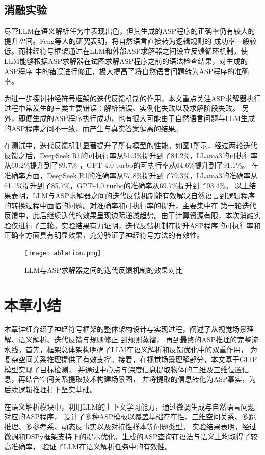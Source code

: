\subsection{消融实验}
尽管LLM在语义解析任务中表现出色，但其生成的ASP程序的正确率仍有较大的提升空间。Feng\cite{feng2024language}等人的研究表明，将自然语言直接转为逻辑规则的
成功率一般较低。而神经符号框架通过在LLM和外部ASP求解器之间设立反馈循环机制，使LLM能够根据ASP求解器在试图求解ASP程序之前的语法检查结果，对生成的ASP程序
中的错误进行修正，极大提高了将自然语言问题转为ASP程序的准确率。

为进一步探讨神经符号框架的迭代反馈机制的作用，本文重点关注ASP求解器执行过程中常发生的三类主要错误：解析错误、实例化失败以及求解阶段失败。
另外，即便生成的ASP程序执行成功，也有很大可能由于自然语言问题与LLM生成的ASP程序之间不一致，而产生与真实答案偏离的结果。

在测试中，迭代反馈机制显著提升了所有模型的性能。如图\ref{fig:ablation}所示，经过两轮迭代反馈之后，DeepSeek R1的可执行率从51.3\%提升到了84.2\%，LLama3的可执行率从60.2\%提升到了89.7\%
，GPT-4.0 turbo的可执行率从64.6\%提升到了91.1\%。
在准确率方面，DeepSeek R1的准确率从57.8\%提升到了79.3\%，LLama3的准确率从61.1\%提升到了85.7\%，GPT-4.0 turbo的准确率从69.7\%提升到了93.4\%。
以上结果表明，LLM与ASP求解器之间的迭代反馈机制能有效解决自然语言到逻辑程序的转换过程中面临的问题。对准确率和可执行率的提升，主要集中在
第一轮迭代反馈中，此后继续迭代的效果呈现边际递减趋势。由于计算资源有限，本次消融实验仅进行了三轮。实验结果有力证明，迭代反馈机制在提升ASP程序的可执行率和
正确率方面具有明显效果，充分验证了神经符号方法的有效性。

\begin{figure}
    \centering
    \texttt{[image: ablation.png]}
    \caption{LLM与ASP求解器之间的迭代反馈机制的效果对比}
    \label{fig:ablation}
\end{figure}

\section{本章小结}
本章详细介绍了神经符号框架的整体架构设计与实现过程，阐述了从视觉场景理解、语义解析、迭代反馈与规则修正
到规则蒸馏，
再到最终的ASP推理的完整流水线。首先，框架总体架构明确了LLM在语义解析和反馈优化中的双重作用，
为复杂空间关系推理提供了有效支撑。接着，在视觉场景理解部分，本文基于GLIP模型实现了目标检测，
并通过中心点与深度信息提取物体的二维及三维位置信息，再结合空间关系提取技术构建场景图，
并将提取的信息转化为ASP事实，为后续逻辑推理打下坚实基础。

在语义解析模块中，利用LLM的上下文学习能力，通过微调生成与自然语言问题对应的ASP程序，
设计了多种ASP模板以覆盖基础存在性、三维空间关系、多跳推理、多参考系、动态反事实以及对抗性样本等问题类型。
实验结果表明，经过微调和DSPy框架支持下的提示优化，生成的ASP查询在语法与语义上均取得了较高准确率，
验证了LLM在语义解析任务中的有效性。

